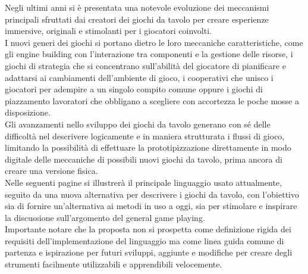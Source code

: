 Negli ultimi anni si è presentata una notevole evoluzione dei meccanismi principali sfruttati dai creatori
dei giochi da tavolo per creare esperienze immersive, originali e stimolanti  per i giocatori coinvolti. \\
I nuovi generi dei giochi si portano dietro le loro meccaniche caratteristiche,
come gli engine building con l’interazione tra componenti e la gestione delle risorse,
i giochi di strategia che si concentrano sull’abilità del giocatore di pianificare e adattarsi ai cambiamenti dell’ambiente di gioco, 
i cooperativi che unisco i giocatori per adempire a un singolo compito comune oppure i giochi di piazzamento lavoratori 
che obbligano a scegliere con accortezza le poche mosse a disposizione. \\
Gli avanzamenti nello sviluppo dei giochi da tavolo generano con sé delle difficoltà nel descrivere logicamente 
e in maniera strutturata i flussi di gioco, limitando la possibilità di effettuare la prototipizzazione 
direttamente in modo digitale delle meccaniche di possibili nuovi giochi da tavolo, prima ancora di creare una versione fisica. \\
Nelle seguenti pagine si illustrerà il principale linguaggio usato attualmente, 
seguito da una nuova alternativa per descrivere i giochi da tavolo, 
con l’obiettivo sia di fornire un’alternativa ai metodi in uso a oggi, 
sia per stimolare e inspirare la discussione sull’argomento del general game playing. \\
Importante notare che la proposta non si prospetta come definizione rigida dei requisiti dell’implementazione del linguaggio 
ma come linea guida comune di partenza e ispirazione per futuri sviluppi, 
aggiunte e modifiche per creare degli strumenti facilmente utilizzabili e apprendibili velocemente. \\

